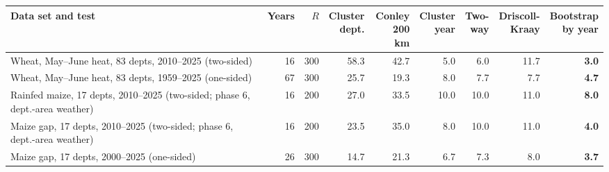 \begin{tabular}{>{\raggedright}p{4.4cm}rrrrrrrr}
\toprule
Data set and test & Years & $R$ & \shortstack{Cluster\\dept.} & \shortstack{Conley\\200 km} & \shortstack{Cluster\\year} & \shortstack{Two-\\way} & \shortstack{Driscoll-\\Kraay} & \shortstack{Bootstrap\\by year} \\
\midrule
Wheat, May--June heat, 83 depts, 2010--2025 (two-sided) & 16 & 300 & 58.3 & 42.7 & 5.0 & 6.0 & 11.7 & \textbf{3.0} \\
Wheat, May--June heat, 83 depts, 1959--2025 (one-sided) & 67 & 300 & 25.7 & 19.3 & 8.0 & 7.7 & 7.7 & \textbf{4.7} \\
Rainfed maize, 17 depts, 2010--2025 (two-sided; phase 6, dept.-area weather) & 16 & 200 & 27.0 & 33.5 & 10.0 & 10.0 & 11.0 & \textbf{8.0} \\
Maize gap, 17 depts, 2010--2025 (two-sided; phase 6, dept.-area weather) & 16 & 200 & 23.5 & 35.0 & 8.0 & 10.0 & 11.0 & \textbf{4.0} \\
Maize gap, 17 depts, 2000--2025 (one-sided) & 26 & 300 & 14.7 & 21.3 & 6.7 & 7.3 & 8.0 & \textbf{3.7} \\
\bottomrule
\end{tabular}

